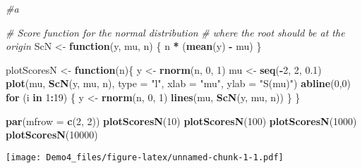 \documentclass[
]{article}
\newenvironment{Shaded}{\begin{snugshade}}{\end{snugshade}}
\newcommand{\AttributeTok}[1]{\textcolor[rgb]{0.13,0.29,0.53}{#1}}
\newcommand{\CommentTok}[1]{\textcolor[rgb]{0.56,0.35,0.01}{\textit{#1}}}
\newcommand{\ControlFlowTok}[1]{\textcolor[rgb]{0.13,0.29,0.53}{\textbf{#1}}}
\newcommand{\DecValTok}[1]{\textcolor[rgb]{0.00,0.00,0.81}{#1}}
\newcommand{\FloatTok}[1]{\textcolor[rgb]{0.00,0.00,0.81}{#1}}
\newcommand{\FunctionTok}[1]{\textcolor[rgb]{0.13,0.29,0.53}{\textbf{#1}}}
\newcommand{\NormalTok}[1]{#1}
\newcommand{\OtherTok}[1]{\textcolor[rgb]{0.56,0.35,0.01}{#1}}
\newcommand{\SpecialCharTok}[1]{\textcolor[rgb]{0.81,0.36,0.00}{\textbf{#1}}}
\newcommand{\StringTok}[1]{\textcolor[rgb]{0.31,0.60,0.02}{#1}}
\begin{document}
\begin{Shaded}
\begin{Highlighting}[]
\CommentTok{\#a}

\CommentTok{\# Score function for the normal distribution}
\CommentTok{\# where the root should be at the origin}
\NormalTok{ScN }\OtherTok{\textless{}{-}} \ControlFlowTok{function}\NormalTok{(y, mu, n) \{ n }\SpecialCharTok{*}\NormalTok{ (}\FunctionTok{mean}\NormalTok{(y) }\SpecialCharTok{{-}}\NormalTok{ mu) \}}


\NormalTok{plotScoresN }\OtherTok{\textless{}{-}} \ControlFlowTok{function}\NormalTok{(n)\{}
\NormalTok{  y }\OtherTok{\textless{}{-}} \FunctionTok{rnorm}\NormalTok{(n, }\DecValTok{0}\NormalTok{, }\DecValTok{1}\NormalTok{)}
\NormalTok{  mu }\OtherTok{\textless{}{-}} \FunctionTok{seq}\NormalTok{(}\SpecialCharTok{{-}}\DecValTok{2}\NormalTok{, }\DecValTok{2}\NormalTok{, }\FloatTok{0.1}\NormalTok{)}
  \FunctionTok{plot}\NormalTok{(mu, }\FunctionTok{ScN}\NormalTok{(y, mu, n), }\AttributeTok{type =} \StringTok{"l"}\NormalTok{, }\AttributeTok{xlab =} \StringTok{"mu"}\NormalTok{, }\AttributeTok{ylab =} \StringTok{"S(mu)"}\NormalTok{)}
  \FunctionTok{abline}\NormalTok{(}\DecValTok{0}\NormalTok{,}\DecValTok{0}\NormalTok{)}
  \ControlFlowTok{for}\NormalTok{ (i }\ControlFlowTok{in} \DecValTok{1}\SpecialCharTok{:}\DecValTok{19}\NormalTok{) \{}
\NormalTok{  y }\OtherTok{\textless{}{-}} \FunctionTok{rnorm}\NormalTok{(n, }\DecValTok{0}\NormalTok{, }\DecValTok{1}\NormalTok{)}
  \FunctionTok{lines}\NormalTok{(mu, }\FunctionTok{ScN}\NormalTok{(y, mu, n))}
\NormalTok{  \}}
\NormalTok{\}}

\FunctionTok{par}\NormalTok{(}\AttributeTok{mfrow =} \FunctionTok{c}\NormalTok{(}\DecValTok{2}\NormalTok{, }\DecValTok{2}\NormalTok{))}
\FunctionTok{plotScoresN}\NormalTok{(}\DecValTok{10}\NormalTok{)}
\FunctionTok{plotScoresN}\NormalTok{(}\DecValTok{100}\NormalTok{)}
\FunctionTok{plotScoresN}\NormalTok{(}\DecValTok{1000}\NormalTok{)}
\FunctionTok{plotScoresN}\NormalTok{(}\DecValTok{10000}\NormalTok{)}
\end{Highlighting}
\end{Shaded}

\texttt{[image: Demo4\_files/figure-latex/unnamed-chunk-1-1.pdf]}
\end{document}
